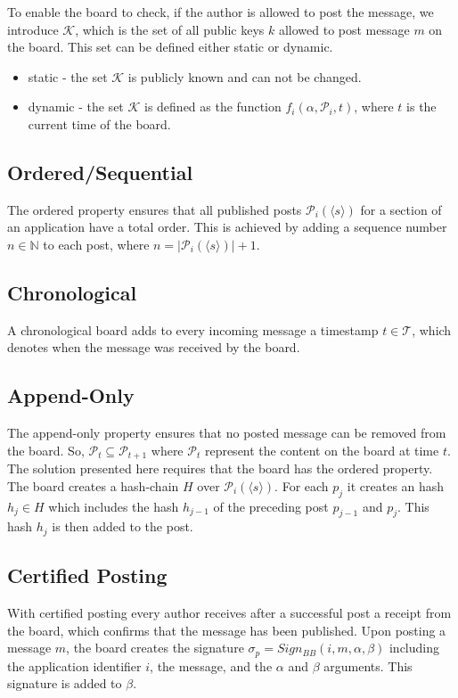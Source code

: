 \documentclass[bibtotoc,halfparskip,oneside]{scrreprt}
\begin{document}
To enable the board to check, if the author is allowed to post the message, we introduce $\mathcal{K}$, which is the set of all public keys $k$ allowed to post message $m$ on the board. This set can be defined either static or dynamic.

\begin{itemize}
	\item static - the set $\mathcal{K}$ is publicly known and can not be changed.
	\item dynamic - the set $\mathcal{K}$ is defined as the function $f_i(\alpha, \mathcal{P}_i, t)$, where $t$ is the current time of the board.
\end{itemize}
 
 \subsection{Ordered/Sequential}
 
 The ordered property ensures that all published posts $\mathcal{P}_i(\langle s\rangle)$ for a section of an application have a total order. This is achieved by adding a sequence number $n\in\mathbb{N}$ to each post, where $n=|\mathcal{P}_i(\langle s\rangle)|+1$.

 
  \subsection{Chronological}
 A chronological board adds to every incoming message a timestamp $t\in\mathcal{T}$, which denotes when the message was received by the board.
 
 \subsection{Append-Only}
 
 The append-only property ensures that no posted message can be removed from the board. So, $\mathcal{P}_t \subseteq \mathcal{P}_{t+1}$ where $\mathcal{P}_{t} $ represent the content on the board at time $t$. The solution presented here requires that the board has the ordered property. The board creates a hash-chain $H$ over $\mathcal{P}_i(\langle s\rangle)$. For each $p_j$ it creates an hash $h_j\in{H}$ which includes the hash $h_{j-1}$ of the preceding post $p_{j-1}$ and $p_j$. This hash $h_j$ is then added to the post.

\subsection{Certified Posting}
With certified posting every author receives after a successful post a receipt from the board, which confirms that the message has been published.
Upon posting a message $m$, the board creates the signature $\sigma_p= Sign_{BB}(i, m, \alpha,\beta)$ including the application identifier $i$, the message, and the $\alpha$ and $\beta$ arguments. This signature is added to $\beta$.
\end{document}
